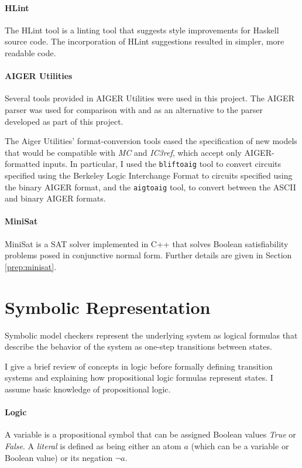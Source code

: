 \documentclass[12pt,a4paper,twoside,openright]{report}
\begin{document}
{\paragraph{HLint}{
The HLint tool \cite{hlint} is a linting tool that suggests style improvements for
Haskell source code.
The incorporation of HLint suggestions resulted in simpler, more readable code.
}

\paragraph{AIGER Utilities}{
Several tools provided in AIGER Utilities \cite{aiger} were used in this project.
The
AIGER parser was used for comparison with and as an alternative
to the parser developed as part of this project. 

The Aiger Utilities' format-conversion tools
eased the specification of new models that would
be compatible with \emph{MC} and \emph{IC3ref},
which accept only AIGER-formatted inputs.
In particular, I used the {\tt bliftoaig}
tool to convert circuits specified using the Berkeley Logic Interchange Format
to circuits specified using the binary AIGER format, and the {\tt aigtoaig} tool,
to convert between the ASCII and binary AIGER formats. }

\paragraph{MiniSat}{
MiniSat \cite{minisat,een05}
is a SAT solver implemented in C++ that solves Boolean satisfiability problems
posed in conjunctive normal form. Further details are given in Section \ref{prep:minisat}.
}

\section{Symbolic Representation}
\label{prep:logic}

Symbolic model checkers represent the underlying system as
logical formulas that describe the behavior of the system as one-step transitions
between states. %

I give a brief review of concepts in logic before formally defining transition systems
and explaining how propositional logic formulas represent states. I assume basic
knowledge of propositional logic.

\paragraph{Logic}{
A variable is a propositional symbol that can be assigned Boolean values {\it True}
or {\it False}. A \emph{literal} is defined as being either an atom $a$ (which can
be a variable or Boolean value) or its negation $\neg a$.

}}
\end{document}
